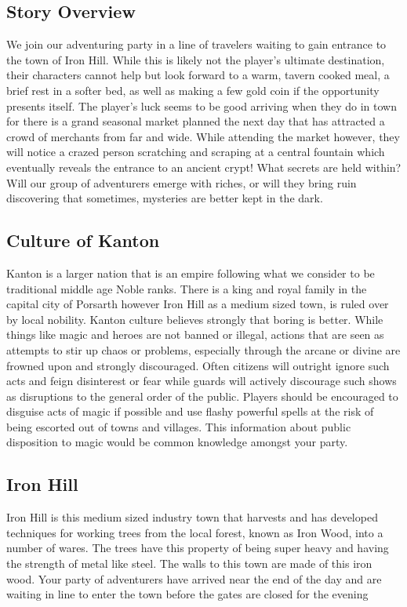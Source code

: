 \documentclass[letterpaper,twocolumn,openany,nodeprecatedcode]{dndbook}
\begin{document}
\subsection{Story Overview}
We join our adventuring party in a line of travelers waiting to gain entrance to the town of Iron Hill. While this is likely not the player's ultimate destination, their characters cannot help but look forward to a warm, tavern cooked meal, a brief rest in a softer bed, as well as making a few gold coin if the opportunity presents itself. The player's luck seems to be good arriving when they do in town for there is a grand seasonal market planned the next day that has attracted a crowd of merchants from far and wide. While attending the market however, they will notice a crazed person scratching and scraping at a central fountain which eventually reveals the entrance to an ancient crypt! What secrets are held within? Will our group of adventurers emerge with riches, or will they bring ruin discovering that sometimes, mysteries are better kept in the dark.

\subsection{Culture of Kanton}
Kanton is a larger nation that is an empire following what we consider to be traditional middle age Noble ranks. There is a king and royal family in the capital city of Porsarth however Iron Hill as a medium sized town, is ruled over by local nobility. Kanton culture believes strongly that boring is better. While things like magic and heroes are not banned or illegal, actions that are seen as attempts to stir up chaos or problems, especially through the arcane or divine are frowned upon and strongly discouraged. Often citizens will outright ignore such acts and feign disinterest or fear while guards will actively discourage such shows as disruptions to the general order of the public. Players should be encouraged to disguise acts of magic if possible and use flashy powerful spells at the risk of being escorted out of towns and villages. This information about public disposition to magic would be common knowledge amongst your party.

\subsection{Iron Hill}
Iron Hill is this medium sized industry town that harvests and has developed techniques for working trees from the local forest, known as Iron Wood, into a number of wares.   The trees have this property of being super heavy and having the strength of metal like steel.  The walls to this town are made of this iron wood.  Your party of adventurers have arrived near the end of the day and are waiting in line to enter the town before the gates are closed for the evening
\end{document}
